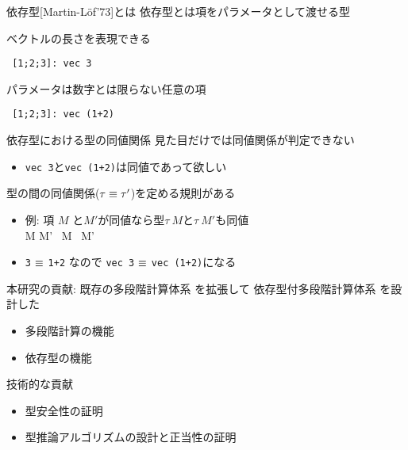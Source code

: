 \documentclass[dvipdfmx,aspectratio=169, 20pt]{beamer}
\renewcommand{\V}{\vdash}
\begin{document}
\begin{frame}[fragile]{依存型[Martin-L{\"o}f'73]とは}
    \renewcommand{\V}{\text{vec}\ }
    依存型とは項をパラメータとして渡せる型
    \begin{exampleblock}{ベクトルの長さを表現できる}
        \begin{Verbatim}
 [1;2;3]: vec 3
        \end{Verbatim}
    \end{exampleblock}
    \begin{exampleblock}{パラメータは数字とは限らない任意の項}
        \begin{Verbatim}
 [1;2;3]: vec (1+2) 
        \end{Verbatim}
    \end{exampleblock}
\end{frame}

\begin{frame}[fragile]{依存型における型の同値関係}
    見た目だけでは同値関係が判定できない
    \begin{itemize}
        \item \verb|vec 3|と\verb|vec (1+2)|は同値であって欲しい
    \end{itemize}
    型の間の同値関係(\( \tau \equiv \tau'\))を定める規則がある\\
    \begin{itemize}
    \item 例: 項 \(M \) と\(M'\)が同値なら型\( \tau\ M \)と\( \tau\ M'\)も同値 \\[2mm]
    \hspace{15mm} {\small \infrule
    { M \E M' }
    { \tau\ M \E \tau\ M'}}
\item \verb|3| \( \equiv \) \verb|1+2| なので \verb|vec 3| \( \equiv \) \verb|vec (1+2)|になる
    \end{itemize}
\end{frame}

\begin{frame}[fragile]{本研究の貢献: \LMD}
    既存の多段階計算体系  を拡張して
    依存型付多段階計算体系 \LMD を設計した
    \begin{itemize}
        \item 多段階計算の機能
        \item 依存型の機能
    \end{itemize}
    技術的な貢献
    \begin{itemize}
        \item 型安全性の証明
        \item 型推論アルゴリズムの設計と正当性の証明
    \end{itemize}
\end{frame}
\end{document}
